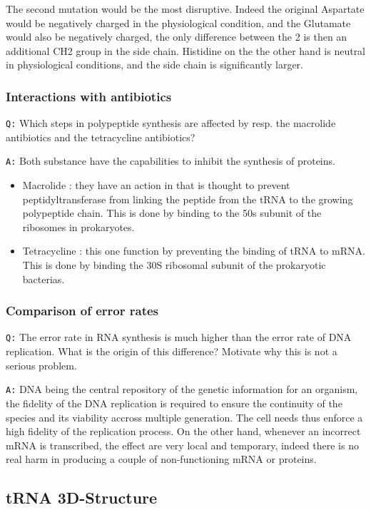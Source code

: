 \documentclass[11pt, a4paper,titlepage]{article}
\begin{document}
The second mutation would be the most disruptive. Indeed the original
Aspartate would be negatively charged in the physiological condition,
and the Glutamate would also be negatively charged, the only
difference between the 2 is then an additional CH2 group in the side
chain. Histidine on the the other hand is neutral in physiological
conditions, and the side chain is significantly larger.
\subsubsection{Interactions with antibiotics}
\label{sec-1-2-4}

\texttt{Q:} Which steps in polypeptide synthesis are affected by resp. the
macrolide antibiotics and the tetracycline antibiotics?

\texttt{A:} Both substance have the capabilities to inhibit the synthesis of
proteins. 

\begin{itemize}
\item Macrolide : they have an action in that is thought to prevent
  peptidyltransferase from linking the peptide from the tRNA to the
  growing polypeptide chain. This is done by binding to the 50s
  subunit of the ribosomes in prokaryotes.
\item Tetracycline : this one function by preventing the binding of tRNA
  to mRNA. This is done by binding the 30S ribosomal subunit of the
  prokaryotic bacterias.
\end{itemize}
\subsubsection{Comparison of error rates}
\label{sec-1-2-5}

\texttt{Q:} The error rate in RNA synthesis is much higher than the error rate
of DNA replication. What is the origin of this difference? Motivate
why this is not a serious problem.

\texttt{A:} DNA being the central repository of the genetic information for
an organism, the fidelity of the DNA replication is required to ensure
the continuity of the species and its viability accross multiple
generation. The cell needs thus enforce a high fidelity of the
replication process. On the other hand, whenever an incorrect mRNA is
transcribed, the effect are very local and temporary, indeed there is
no real harm in producing a couple of non-functioning mRNA or
proteins.
\subsection{tRNA 3D-Structure}
\label{sec-1-3}
\end{document}
